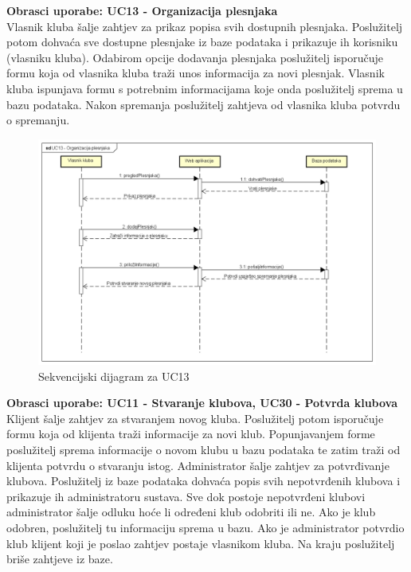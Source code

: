 				\textbf{Obrasci uporabe: UC13 - Organizacija plesnjaka}\\
				
				Vlasnik kluba šalje zahtjev za prikaz popisa svih dostupnih plesnjaka. Poslužitelj potom dohvaća sve dostupne plesnjake iz baze podataka i prikazuje ih korisniku (vlasniku kluba). Odabirom opcije dodavanja plesnjaka poslužitelj isporučuje formu koja od vlasnika kluba traži unos informacija za novi plesnjak. Vlasnik kluba ispunjava formu s potrebnim informacijama koje onda poslužitelj sprema u bazu podataka. Nakon spremanja poslužitelj zahtjeva od vlasnika kluba potvrdu o spremanju.
				
				\begin{figure}[H]
					\centering
					\includegraphics[width=\textwidth]{slike/seq_dijagram3.png}
					\caption{Sekvencijski dijagram za UC13}
					\label{fig:my_label}
				\end{figure}
			
		\newpage
			
				\textbf{Obrasci uporabe: UC11 - Stvaranje klubova, UC30 - Potvrda klubova}\\
				
				Klijent šalje zahtjev za stvaranjem novog kluba. Poslužitelj potom isporučuje formu koja od klijenta  traži informacije za novi klub. Popunjavanjem forme poslužitelj sprema informacije o novom klubu u bazu podataka te zatim traži od klijenta potvrdu o stvaranju istog. Administrator šalje zahtjev za potvrđivanje klubova. Poslužitelj iz baze podataka dohvaća popis svih nepotvrđenih klubova i prikazuje ih administratoru sustava. Sve dok postoje nepotvrđeni klubovi administrator šalje odluku hoće li određeni klub odobriti ili ne. Ako je klub odobren, poslužitelj tu informaciju sprema u bazu. Ako je administrator potvrdio klub klijent koji je poslao zahtjev postaje vlasnikom kluba. Na kraju poslužitelj briše zahtjeve iz baze.
				
